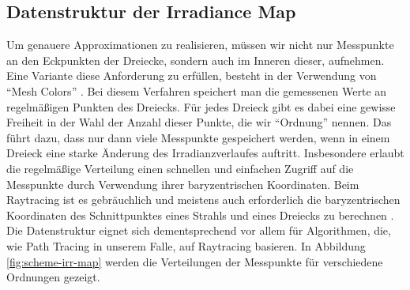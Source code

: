 
	\subsection{Datenstruktur der Irradiance Map} %
	\label{sub:datenstruktur_der_irradiance_map}

		Um genauere Approximationen zu realisieren, müssen wir nicht nur Messpunkte an den Eckpunkten der Dreiecke, sondern auch im Inneren dieser, aufnehmen.
		Eine Variante diese Anforderung zu erfüllen, besteht in der Verwendung von \enquote{Mesh Colors} \cite{mesh-colors}.
		Bei diesem Verfahren speichert man die gemessenen Werte an regelmäßigen Punkten des Dreiecks.
		Für jedes Dreieck gibt es dabei eine gewisse Freiheit in der Wahl der Anzahl dieser Punkte, die wir \enquote{Ordnung} nennen.
		Das führt dazu, dass nur dann viele Messpunkte gespeichert werden, wenn in einem Dreieck eine starke Änderung des Irradianzverlaufes auftritt.
		Insbesondere erlaubt die regelmäßige Verteilung einen schnellen und einfachen Zugriff auf die Messpunkte durch Verwendung ihrer baryzentrischen Koordinaten.
		Beim Raytracing ist es gebräuchlich und meistens auch erforderlich die baryzentrischen Koordinaten des Schnittpunktes eines Strahls und eines Dreiecks zu berechnen \cite{ray-triangle-intersection}.
		Die Datenstruktur eignet sich dementsprechend vor allem für Algorithmen, die, wie Path Tracing in unserem Falle, auf Raytracing basieren.
		In Abbildung \ref{fig:scheme-irr-map} werden die Verteilungen der Messpunkte für verschiedene Ordnungen gezeigt.

